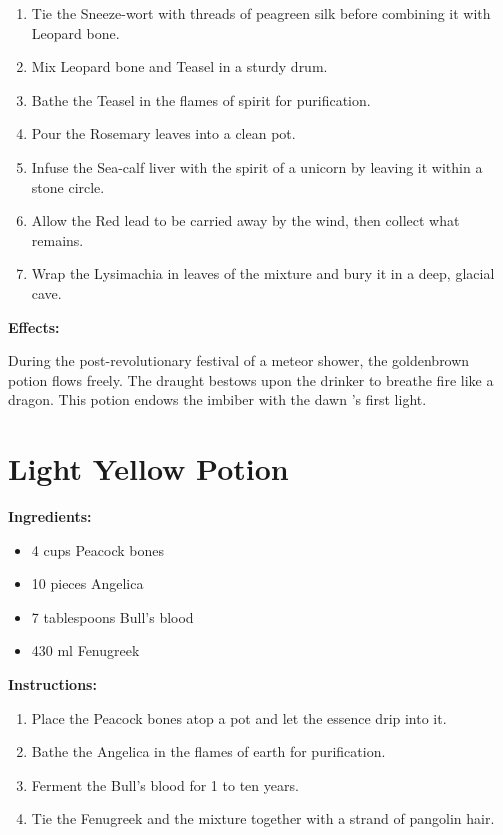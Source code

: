\documentclass{article}
\begin{document}
\begin{enumerate}
  \item Tie the Sneeze-wort with threads of peagreen silk before combining it with Leopard bone.
  \item Mix Leopard bone and Teasel in a sturdy drum.
  \item Bathe the Teasel in the flames of spirit for purification.
  \item Pour the Rosemary leaves into a clean pot.
  \item Infuse the Sea-calf liver with the spirit of a unicorn by leaving it within a stone circle.
  \item Allow the Red lead to be carried away by the wind, then collect what remains.
  \item Wrap the Lysimachia in leaves of the mixture and bury it in a deep, glacial cave.
\end{enumerate}

\textbf{Effects:}

During the post-revolutionary festival of a meteor shower, the goldenbrown potion flows freely. The draught bestows upon the drinker to breathe fire like a dragon. This potion endows the imbiber with the dawn 's first light.

\newpage
\section*{Light Yellow Potion}

\textbf{Ingredients:}

\begin{itemize}
  \item 4 cups Peacock bones
  \item 10 pieces Angelica
  \item 7 tablespoons Bull's blood
  \item 430 ml Fenugreek
\end{itemize}

\textbf{Instructions:}

\begin{enumerate}
  \item Place the Peacock bones atop a pot and let the essence drip into it.
  \item Bathe the Angelica in the flames of earth for purification.
  \item Ferment the Bull's blood for 1 to ten years.
  \item Tie the Fenugreek and the mixture together with a strand of pangolin hair.
\end{enumerate}
\end{document}
